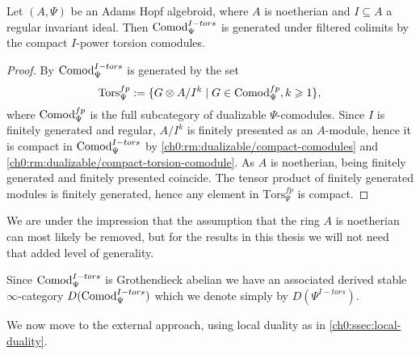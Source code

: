 \begin{lemma}
    \label{ch0:lm:torsion-comodules-generated-by-compacts}
    Let $(A,\Psi)$ be an Adams Hopf algebroid, where $A$ is noetherian and $I\subseteq A$ a regular invariant ideal. Then $\mathrm{Comod}_\Psi^{I-tors}$ is generated under filtered colimits by the compact $I$-power torsion comodules. 
\end{lemma}
\begin{proof}
    By \cite[3.4]{barthel-heard-valenzuela_2020} $\mathrm{Comod}_\Psi^{I-tors}$ is generated by the set 
    $$\mathrm{Tors}_\Psi^{fp}:=\{G\otimes A/I^k \mid G \in \mathrm{Comod}_\Psi^{fp}, k\geqslant 1\},$$
    where $\mathrm{Comod}_\Psi^{fp}$ is the full subcategory of dualizable $\Psi$-comodules. Since $I$ is finitely generated and regular, $A/I^k$ is finitely presented as an $A$-module, hence it is compact in $\mathrm{Comod}_\Psi^{I-tors}$ by \cref{ch0:rm:dualizable/compact-comodules} and \cref{ch0:rm:dualizable/compact-torsion-comodule}. As $A$ is noetherian, being finitely generated and finitely presented coincide. The tensor product of finitely generated modules is finitely generated, hence any element in $\mathrm{Tors}_\Psi^{fp}$ is compact. 
\end{proof}

\begin{remark}
    We are under the impression that the assumption that the ring $A$ is noetherian can most likely be removed, but for the results in this thesis we will not need that added level of generality.  
\end{remark}


\begin{notation}
    Since $\mathrm{Comod}_\Psi^{I-tors}$ is Grothendieck abelian we have an associated derived stable $\infty$-category $D(\mathrm{Comod}_\Psi^{I-tors})$ which we denote simply by $D(\Psi^{I-tors})$.
\end{notation}





We now move to the external approach, using local duality as in \cref{ch0:ssec:local-duality}. 


